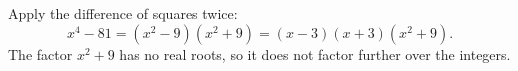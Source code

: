 Apply the difference of squares twice:
\[x^4-81=\left(x^2-9\right)\left(x^2+9\right)=\boxed{(x-3)(x+3)\left(x^2+9\right)}.\]
The factor $x^2+9$ has no real roots, so it does not factor further over the integers.
